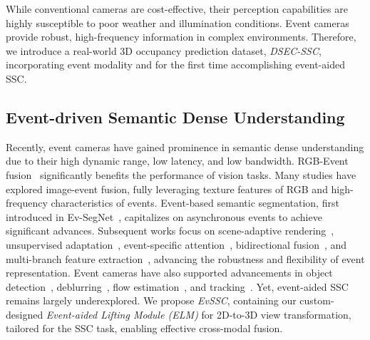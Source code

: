 While conventional cameras are cost-effective, their perception capabilities are highly susceptible to poor weather and illumination conditions.
Event cameras provide robust, high-frequency information in complex environments. 
Therefore, we introduce a real-world 3D occupancy prediction dataset, \emph{DSEC-SSC}, incorporating event modality and for the first time accomplishing event-aided SSC.

%



\subsection{Event-driven Semantic Dense Understanding}
Recently, event cameras have gained prominence in semantic dense understanding due to their high dynamic range, low latency, and low bandwidth. 
RGB-Event fusion~\cite{xia2023cmda,zhang2023cmx,zhen2025event_guided,xie2024eisnet} significantly benefits the performance of vision tasks. 
Many studies have explored image-event fusion, fully leveraging texture features of RGB and high-frequency characteristics of events.
Event-based semantic segmentation, first introduced in Ev-SegNet~\cite{alonso2019ev_segnet}, capitalizes on asynchronous events to achieve significant advances.
Subsequent works focus on scene-adaptive rendering~\cite{low2021superevents}, unsupervised adaptation~\cite{sun2022ess}, event-specific attention~\cite{jia2023event_posterior}, bidirectional fusion~\cite{zhang2021issafe,zhang2021exploring}, and multi-branch feature extraction~\cite{zhang2024spikingedn,long2024spike_brgnet}, advancing the robustness and flexibility of event representation. 
%
Event cameras have also supported advancements in object detection~\cite{cao2024embracing,liu2024enhancing_traffic,li2023sodformer}, deblurring~\cite{sun2022event_deblurring,kim2024frequency,yang2024latency}, flow estimation~\cite{wan2023rpeflow,ye2023towards_event}, and tracking~\cite{zhang2023frame_event_tracking,wang2023visevent,wang2024towards_robust_tracking}. 
Yet, event-aided SSC remains largely underexplored. 
We propose \emph{EvSSC}, containing our custom-designed \emph{Event-aided Lifting Module (ELM)} for 2D-to-3D view transformation, tailored for the SSC task, enabling effective cross-modal fusion.

